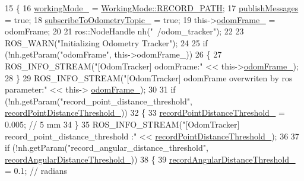 \begin{DoxyCode}
15 \{
16     \hyperlink{classcl__move__base__z_1_1odom__tracker_1_1OdomTracker_a5ae598c85c4469f4c0e984480575c42b}{workingMode\_} = \hyperlink{namespacecl__move__base__z_1_1odom__tracker_ac46b05813b2791604f6cd0a39ace3ef8a023bc3adf68871ef7a0c616765ac80a7}{WorkingMode::RECORD\_PATH};
17     \hyperlink{classcl__move__base__z_1_1odom__tracker_1_1OdomTracker_a4f253d45ab5750dee3c2f18dd5599725}{publishMessages} = \textcolor{keyword}{true};
18     \hyperlink{classcl__move__base__z_1_1odom__tracker_1_1OdomTracker_afbe614b53a1493eb8268b8ea65b5b93a}{subscribeToOdometryTopic\_} = \textcolor{keyword}{true};
19     this->\hyperlink{classcl__move__base__z_1_1odom__tracker_1_1OdomTracker_a54f31af5e74006560d94f266297853d4}{odomFrame\_} = odomFrame;
20 
21     ros::NodeHandle nh(\textcolor{stringliteral}{"~/odom\_tracker"});
22 
23     ROS\_WARN(\textcolor{stringliteral}{"Initializing Odometry Tracker"});
24 
25     \textcolor{keywordflow}{if} (!nh.getParam(\textcolor{stringliteral}{"odomFrame"}, this->odomFrame\_))
26     \{
27         ROS\_INFO\_STREAM(\textcolor{stringliteral}{"[OdomTracker] odomFrame:"} << this->\hyperlink{classcl__move__base__z_1_1odom__tracker_1_1OdomTracker_a54f31af5e74006560d94f266297853d4}{odomFrame\_});
28     \}
29     ROS\_INFO\_STREAM(\textcolor{stringliteral}{"[OdomTracker] odomFrame overwriten by ros parameter:"} << this->
      \hyperlink{classcl__move__base__z_1_1odom__tracker_1_1OdomTracker_a54f31af5e74006560d94f266297853d4}{odomFrame\_});
30 
31     \textcolor{keywordflow}{if} (!nh.getParam(\textcolor{stringliteral}{"record\_point\_distance\_threshold"}, 
      \hyperlink{classcl__move__base__z_1_1odom__tracker_1_1OdomTracker_a3a1173716d527bd182d04656491e01dd}{recordPointDistanceThreshold\_}))
32     \{
33         \hyperlink{classcl__move__base__z_1_1odom__tracker_1_1OdomTracker_a3a1173716d527bd182d04656491e01dd}{recordPointDistanceThreshold\_} = 0.005; \textcolor{comment}{// 5 mm}
34     \}
35     ROS\_INFO\_STREAM(\textcolor{stringliteral}{"[OdomTracker] record\_point\_distance\_threshold :"} << 
      \hyperlink{classcl__move__base__z_1_1odom__tracker_1_1OdomTracker_a3a1173716d527bd182d04656491e01dd}{recordPointDistanceThreshold\_});
36 
37     \textcolor{keywordflow}{if} (!nh.getParam(\textcolor{stringliteral}{"record\_angular\_distance\_threshold"}, 
      \hyperlink{classcl__move__base__z_1_1odom__tracker_1_1OdomTracker_a1274fe5334c109cd9c2339beb9411441}{recordAngularDistanceThreshold\_}))
38     \{
39         \hyperlink{classcl__move__base__z_1_1odom__tracker_1_1OdomTracker_a1274fe5334c109cd9c2339beb9411441}{recordAngularDistanceThreshold\_} = 0.1; \textcolor{comment}{// radians}

\end{DoxyCode}
